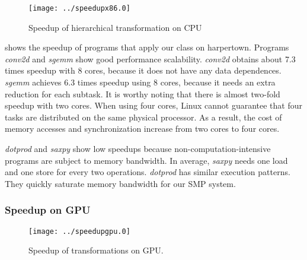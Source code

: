 \begin{figure}
  \texttt{[image: ../speedupx86.0]}
  \caption{Speedup of hierarchical transformation on CPU}
  \label{fig:spdx86}
\end{figure}

 shows the speedup of programs that apply our
 class on harpertown. 
Programs \textit{conv2d} and \textit{sgemm} show good performance scalability.
\textit{conv2d} obtains about 7.3 times speedup with 8 cores, because it does not
have any data dependences.
\textit{sgemm} achieves 6.3 times speedup using 8 cores, because it
needs an extra reduction for each subtask.  It is
worthy noting that there is almost two-fold speedup with two cores. 
When using four cores, Linux cannot guarantee that four tasks are distributed
on the same physical processor. As a result, the cost of memory accesses and synchronization
increase from two cores to four cores.


\textit{dotprod} and \textit{saxpy} show low speedups because non-computation-intensive
programs are subject to memory bandwidth.  In average, \textit{saxpy} needs one load and one 
store for every two operations. \textit{dotprod} has similar execution patterns.
They quickly saturate memory bandwidth for our SMP system. 


\subsubsection{Speedup on GPU}\label{exp:2}

\begin{figure}
\texttt{[image: ../speedupgpu.0]}
\caption{Speedup of transformations on GPU.}
\label{fig:spdgpu}
\end{figure}

